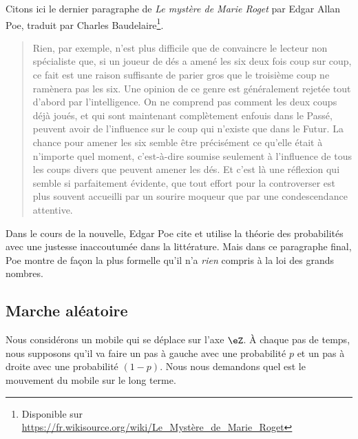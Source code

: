 \begin{example}
    Citons ici le dernier paragraphe de \emph{Le mystère de Marie Roget} par Edgar Allan Poe, traduit par Charles Baudelaire\footnote{Disponible sur \url{https://fr.wikisource.org/wiki/Le_Mystère_de_Marie_Roget}}.

    \begin{quote}
Rien, par exemple, n’est plus difficile que de convaincre le lecteur non spécialiste que, si un joueur de dés a amené les six deux fois coup sur coup, ce fait est une raison suffisante de parier gros que le troisième coup ne ramènera pas les six. Une opinion de ce genre est généralement rejetée tout d’abord par l’intelligence. On ne comprend pas comment les deux coups déjà joués, et qui sont maintenant complètement enfouis dans le Passé, peuvent avoir de l’influence sur le coup qui n’existe que dans le Futur. La chance pour amener les six semble être précisément ce qu’elle était à n’importe quel moment, c’est-à-dire soumise seulement à l’influence de tous les coups divers que peuvent amener les dés. Et c’est là une réflexion qui semble si parfaitement évidente, que tout effort pour la controverser est plus souvent accueilli par un sourire moqueur que par une condescendance attentive. 
    \end{quote}
    Dans le cours de la nouvelle, Edgar Poe cite et utilise la théorie des probabilités avec une justesse inaccoutumée dans la littérature. Mais dans ce paragraphe final, Poe montre de façon la plus formelle qu'il n'a \emph{rien} compris à la loi des grands nombres.
\end{example}

\subsection{Marche aléatoire}

Nous considérons un mobile qui se déplace sur l'axe \( \eZ\). À chaque pas de temps, nous supposons qu'il va faire un pas à gauche avec une probabilité \( p\) et un pas à droite avec une probabilité \( (1-p)\). Nous nous demandons quel est le mouvement du mobile sur le long terme.

